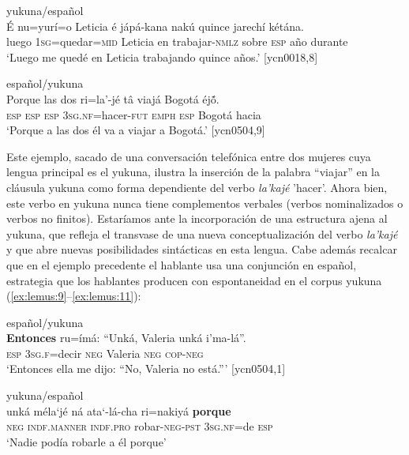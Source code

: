 \documentclass[output=paper]{langscibook}
\begin{document}
\ea\label{ex:lemus:7}
{yukuna/español}\\
\gll É      nu=yurí=o                       Leticia é jápá-kana              nakú quince jarechí kétána.\\
     luego \textsc{1sg}=quedar=\textsc{mid} Leticia en trabajar-\textsc{nmlz} sobre \textsc{esp} año durante\\
\glt `Luego me quedé en Leticia trabajando quince años.' [ycn0018,8]
\z

\newpage
\ea\label{ex:lemus:8}
{español/yukuna}\\
\gll Porque   las dos ri=la’-jé tâ viajá Bogotá éj\'{õ}.\\
\textsc{esp}  \textsc{esp} \textsc{esp}  \textsc{3sg.nf=}hacer-\textsc{fut} \textsc{emph}    \textsc{esp}  Bogotá   hacia\\
\glt `Porque a las dos él va a viajar a Bogotá.' [ycn0504,9]
\z

Este ejemplo, sacado de una conversación telefónica entre dos mujeres cuya lengua principal es el yukuna, ilustra la inserción de la palabra “viajar” en la cláusula yukuna como forma dependiente del verbo \textit{la’kajé} 'hacer'. Ahora bien, este verbo en yukuna nunca tiene complementos verbales (verbos nominalizados o verbos no finitos).  Estaríamos ante la incorporación de una estructura ajena al yukuna, que refleja el transvase de una nueva conceptualización del verbo \textit{la’kajé} y que abre nuevas posibilidades sintácticas en esta lengua.  Cabe además recalcar que en el ejemplo precedente el hablante usa una conjunción en español, estrategia que los hablantes producen con espontaneidad en el corpus yukuna (\ref{ex:lemus:9}--\ref{ex:lemus:11}):

\ea\label{ex:lemus:9}
{español/yukuna}\\
\gll \textbf{Entonces} ru=ímá: “Unká, Valeria   unká   i’ma-lá”.\\
        \textsc{esp} \textsc{3sg.f=}decir \textsc{neg}  Valeria \textsc{neg} \textsc{cop-neg}\\
\glt `Entonces ella me dijo: “No, Valeria no está.”' [ycn0504,1]
\z

\ea\label{ex:lemus:10}
{yukuna/español}\\
\gll unká méla‘jé ná ata‘-lá-cha ri=nakiyá \textbf{porque}\\
     \textsc{neg} \textsc{indf.manner} \textsc{indf.pro}  robar-\textsc{neg-pst} 3\textsc{sg.nf=}de \textsc{esp}\\
\glt `Nadie podía robarle a él porque'
\z
\end{document}
